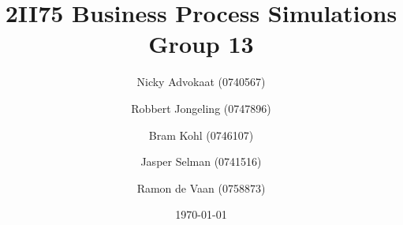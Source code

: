 \documentclass[a4paper,11pt]{article}
\title{
	2II75 Business Process Simulations \\
	\small{Group 13}
}
\author{
	Nicky Advokaat (0740567)
	\and
	Robbert Jongeling (0747896)
	\and
	Bram Kohl (0746107)
	\and
	Jasper Selman (0741516)
	\and
	Ramon de Vaan (0758873)
}
\date{\today}
\begin{document}
	\maketitle
	
	
	
	
		
	\newpage
	\begin{appendix}
	
	\end{appendix}
\end{document}
